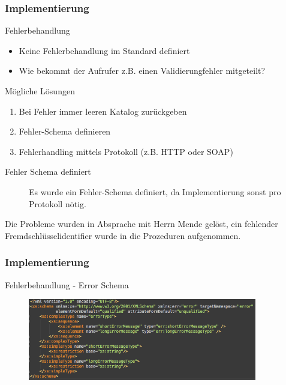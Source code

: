 \documentclass[serif,mathserif]{beamer}
\begin{document}
\begin{frame}
  \frametitle{Implementierung}
 Fehlerbehandlung
  \begin{itemize}
  \item Keine Fehlerbehandlung im Standard definiert
  \item Wie bekommt der Aufrufer z.B. einen Validierungfehler mitgeteilt?
  \end{itemize}
  
 Mögliche Lösungen
   \begin{enumerate}
  \item Bei Fehler immer leeren Katalog zurückgeben 
  \item Fehler-Schema definieren 
  \item Fehlerhandling mittels Protokoll (z.B. HTTP oder SOAP)
  \end{enumerate}
  
  \begin{description}
\item[Fehler Schema definiert] Es wurde ein Fehler-Schema definiert, da Implementierung sonst pro Protokoll nötig. 
\end{description}
  
 Die Probleme wurden in Absprache mit Herrn Mende gelöst, ein fehlender Fremdschlüsselidentifier wurde in die Prozeduren aufgenommen. 
  
\end{frame}


 \begin{frame}
  \frametitle{Implementierung}
  Fehlerbehandlung - Error Schema

     \begin{figure}[t]
     \includegraphics[width=10cm]{images/ErrorSchema.png}
     \end{figure}
 \end{frame}
\end{document}
